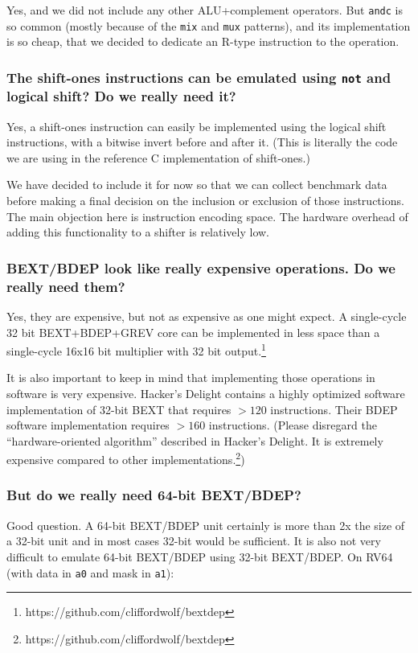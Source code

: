 Yes, and we did not include any other ALU+complement operators. But \texttt{andc}
is so common (mostly because of the \texttt{mix} and \texttt{mux} patterns), and
its implementation is so cheap, that we decided to dedicate an R-type instruction
to the operation.

\subsubsection{The shift-ones instructions can be emulated using {\tt not} and logical shift? Do we really need it?}

Yes, a shift-ones instruction can easily be implemented using the logical shift
instructions, with a bitwise invert before and after it. (This is literally the
code we are using in the reference C implementation of shift-ones.)

We have decided to include it for now so that we can collect benchmark data
before making a final decision on the inclusion or exclusion of those
instructions. The main objection here is instruction encoding space. The
hardware overhead of adding this functionality to a shifter is relatively low.

\subsubsection{BEXT/BDEP look like really expensive operations. Do we really need them?}

Yes, they are expensive, but not as expensive as one might expect. A
single-cycle 32 bit BEXT+BDEP+GREV core can be implemented in less space than a
single-cycle 16x16 bit multiplier with 32 bit output.\footnote{https://github.com/cliffordwolf/bextdep}

It is also important to keep in mind that implementing those operations in
software is very expensive. Hacker's Delight contains a highly optimized
software implementation of 32-bit BEXT that requires $>120$ instructions. Their
BDEP software implementation requires $>160$ instructions. (Please disregard the
``hardware-oriented algorithm'' described in Hacker's Delight. It is
extremely expensive compared to other implementations.\footnote{https://github.com/cliffordwolf/bextdep})

\subsubsection{But do we really need 64-bit BEXT/BDEP?}

Good question. A 64-bit BEXT/BDEP unit certainly is more than 2x the size of a
32-bit unit and in most cases 32-bit would be sufficient. It is also not very difficult
to emulate 64-bit BEXT/BDEP using 32-bit BEXT/BDEP. On RV64 (with data in {\tt a0} and
mask in {\tt a1}):

